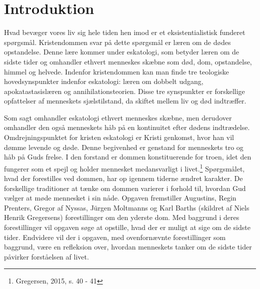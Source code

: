 \chapter{Introduktion}
Hvad bevæger vores liv sig hele tiden hen imod er et eksistentialistisk funderet spørgsmål. Kristendommen svar på dette spørgsmål er læren om de dødes opstandelse. Denne lære kommer under eskatologi, som betyder læren om de sidste tider og omhandler ethvert menneskes skæbne som død, dom, opstandelse, himmel og helvede. Indenfor kristendommen kan man finde tre teologiske hovedsynspunkter indenfor eskatologi: læren om dobbelt udgang, apokatastasislæren og annihilationsteorien. Disse tre synspunkter er forskellige opfattelser af menneskets sjælstilstand, da skiftet mellem liv og død indtræffer.

Som sagt omhandler eskatologi ethvert menneskes skæbne, men derudover omhandler den også menneskets håb på en kontinuitet efter dødens indtrædelse. Omdrejningspunktet for kristen eskatologi er Kristi genkomst, hvor han vil dømme levende og døde. Denne begivenhed er genstand for menneskets tro og håb på Guds frelse. I den forstand er dommen konstituerende for troen, idet den fungerer som et spejl og holder mennesket medansvarligt i livet.\footnote{Gregersen, 2015, s. 40 - 41} Spørgsmålet, hvad der forestilles ved dommen, har op igennem tiderne ændret karakter. De forskellige traditioner at tænke om dommen varierer i forhold til, hvordan Gud vælger at møde mennesket i sin nåde. Opgaven fremstiller Augustins, Regin Prenters, Gregor af Nyssas, Jürgen Moltmanns og Karl Barths (skildret af Niels Henrik Gregersens) forestillinger om den yderste dom. Med baggrund i deres forestillinger vil opgaven søge at opstille, hvad der er muligt at sige om de sidste tider. Endvidere vil der i opgaven, med ovenfornævnte forestillinger som baggrund, være en refleksion over, hvordan menneskets tanker om de sidste tider påvirker forståelsen af livet.